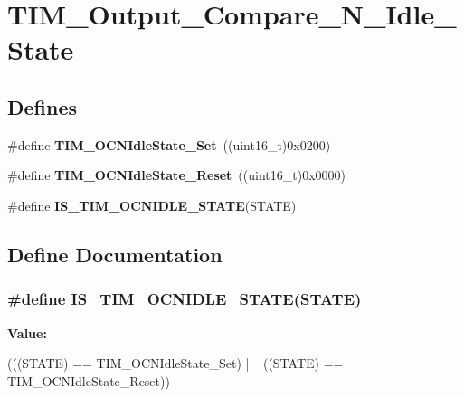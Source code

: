 \hypertarget{group__TIM__Output__Compare__N__Idle__State}{
\section{TIM\_\-Output\_\-Compare\_\-N\_\-Idle\_\-State}
\label{group__TIM__Output__Compare__N__Idle__State}
}
\subsection*{Defines}
\begin{DoxyCompactItemize}
\item 
\hypertarget{group__TIM__Output__Compare__N__Idle__State_ga980392da6eb5bedcbf7ed353e1073f99}{
\#define {\bfseries TIM\_\-OCNIdleState\_\-Set}~((uint16\_\-t)0x0200)}
\label{group__TIM__Output__Compare__N__Idle__State_ga980392da6eb5bedcbf7ed353e1073f99}

\item 
\hypertarget{group__TIM__Output__Compare__N__Idle__State_ga329a32820cdba0af9c4b7a04177e8fdd}{
\#define {\bfseries TIM\_\-OCNIdleState\_\-Reset}~((uint16\_\-t)0x0000)}
\label{group__TIM__Output__Compare__N__Idle__State_ga329a32820cdba0af9c4b7a04177e8fdd}

\item 
\#define {\bfseries IS\_\-TIM\_\-OCNIDLE\_\-STATE}(STATE)
\end{DoxyCompactItemize}


\subsection{Define Documentation}
\hypertarget{group__TIM__Output__Compare__N__Idle__State_ga0987091d1d03ba2db065efb66eff3951}{
\subsubsection[{IS\_\-TIM\_\-OCNIDLE\_\-STATE}]{\setlength{\rightskip}{0pt plus 5cm}\#define IS\_\-TIM\_\-OCNIDLE\_\-STATE(STATE)}}
\label{group__TIM__Output__Compare__N__Idle__State_ga0987091d1d03ba2db065efb66eff3951}
{\bfseries Value:}
\begin{DoxyCode}
(((STATE) == TIM_OCNIdleState_Set) || \
                                     ((STATE) == TIM_OCNIdleState_Reset))
\end{DoxyCode}
